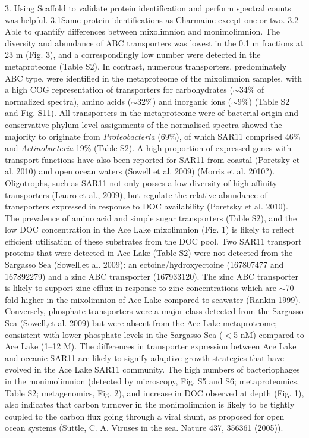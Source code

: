3. Using Scaffold to validate protein identification and perform spectral counts was helpful. 
3.1Same protein identifications as Charmaine except one or two.
3.2 Able to quantify differences between mixolimnion and monimolimnion.
The diversity and abundance of \ac{ABC} transporters was lowest in the 0.1 \textmu{}m fractions at 23 m (Fig. 3), and a correspondingly low number were detected in the metaproteome (Table S2). 
In contrast, numerous transporters, predominately \ac{ABC} type, were identified in the metaproteome of the mixolimnion samples, with a high \ac{COG} representation of transporters for carbohydrates ($\sim$34\% of normalized spectra), amino acids ($\sim$32\%) and inorganic ions ($\sim$9\%) (Table S2 and Fig. S11).
All transporters in the metaproteome were of bacterial origin and conservative phylum level assignments of the normalised spectra showed the majority to originate from \emph{Proteobacteria} (69\%), 
of which SAR11 comprised 46\% and \emph{Actinobacteria} 19\% (Table S2). 
A high proportion of expressed genes with transport functions have also been reported for SAR11 from coastal (Poretsky et al. 2010) and open ocean waters (Sowell et al. 2009) (Morris et al. 2010?). 
Oligotrophs, such as SAR11 not only posses a low-diversity of high-affinity transporters (Lauro et al., 2009), but regulate the relative abundance of transporters expressed in response to \ac{DOC} availability (Poretsky et al. 2010). 
The prevalence of amino acid and simple sugar transporters (Table S2), and the low \ac{DOC} concentration in the Ace Lake mixolimnion (Fig. 1) is likely to reflect efficient utilisation of these substrates from the \ac{DOC} pool. 
Two SAR11 transport proteins that were detected in Ace Lake (Table S2) were not detected from the Sargasso Sea (Sowell,et al. 2009): an ectoine/hydroxyectoine (167807477 and 167892279) and a zinc \ac{ABC} transporter (167933120). The zinc \ac{ABC} transporter is likely to support zinc efflux in response to zinc concentrations which are $\sim$70-fold higher in the mixolimnion of Ace Lake compared to seawater (Rankin 1999). 
Conversely, phosphate transporters were a major class detected from the Sargasso Sea (Sowell,et al. 2009) but were absent from the Ace Lake metaproteome; consistent with lower phosphate levels in the Sargasso Sea ($<$5 nM) compared to Ace Lake (1--12 \textmu{}M). The differences in transporter expression between Ace Lake and oceanic SAR11 are likely to signify adaptive growth strategies that have evolved in the Ace Lake SAR11 community.
The high numbers of bacteriophages in the monimolimnion (detected by microscopy, Fig. S5 and S6; metaproteomics, Table S2; metagenomics, Fig. 2), and increase in \ac{DOC} observed at depth (Fig. 1), also indicates that carbon turnover in the monimolimnion is likely to be tightly coupled to the carbon flux going through a viral shunt, as proposed for open ocean systems (Suttle, C. A. Viruses in the sea. Nature 437, 356361 (2005)). 
